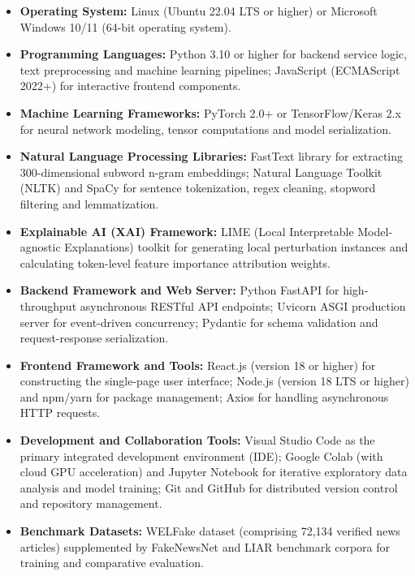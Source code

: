 \documentclass[12pt,a4paper,oneside]{report}
\begin{document}
\begin{itemize}[leftmargin=*, itemsep=4pt]
  \item \textbf{Operating System:} Linux (Ubuntu 22.04 LTS or higher) or Microsoft Windows 10/11
        (64-bit operating system).
  \item \textbf{Programming Languages:} Python 3.10 or higher for backend service logic, text
        preprocessing and machine learning pipelines; JavaScript (ECMAScript 2022+) for interactive
        frontend components.
  \item \textbf{Machine Learning Frameworks:} PyTorch 2.0+ or TensorFlow/Keras 2.x for neural
        network modeling, tensor computations and model serialization.
  \item \textbf{Natural Language Processing Libraries:} FastText library for extracting
        300-dimensional subword n-gram embeddings; Natural Language Toolkit (NLTK) and SpaCy for
        sentence tokenization, regex cleaning, stopword filtering and lemmatization.
  \item \textbf{Explainable AI (XAI) Framework:} LIME (Local Interpretable Model-agnostic
        Explanations) toolkit for generating local perturbation instances and calculating token-level
        feature importance attribution weights.
  \item \textbf{Backend Framework and Web Server:} Python FastAPI for high-throughput asynchronous
        RESTful API endpoints; Uvicorn ASGI production server for event-driven concurrency; Pydantic
        for schema validation and request-response serialization.
  \item \textbf{Frontend Framework and Tools:} React.js (version 18 or higher) for constructing the
        single-page user interface; Node.js (version 18 LTS or higher) and npm/yarn for package
        management; Axios for handling asynchronous HTTP requests.
  \item \textbf{Development and Collaboration Tools:} Visual Studio Code as the primary integrated
        development environment (IDE); Google Colab (with cloud GPU acceleration) and Jupyter Notebook
        for iterative exploratory data analysis and model training; Git and GitHub for distributed
        version control and repository management.
  \item \textbf{Benchmark Datasets:} WELFake dataset (comprising 72,134 verified news articles)
        supplemented by FakeNewsNet and LIAR benchmark corpora for training and comparative evaluation.
\end{itemize}
\end{document}

